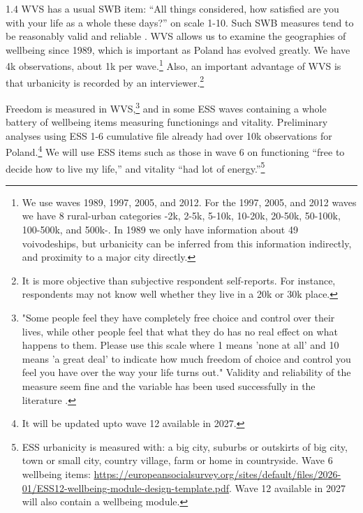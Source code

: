 \documentclass[10pt, letterpaper]{article}
\begin{document}
\begin{spacing}{1.4}
WVS has a usual SWB item:
 ``All things considered, how satisfied are you with your life as a whole these days?''
 on scale 1-10. 
Such SWB measures tend to be reasonably valid and reliable
\citep[][ch. 5]{diener09}. 
% 
WVS allows us to examine the geographies of wellbeing since 1989, which is
important as Poland has evolved greatly.  We have 4k observations, about
  1k per wave.\footnote{We use waves 1989, 1997, 2005, and 2012.
 For the 1997, 2005, and 2012 waves we have 8
rural-urban categories -2k, 2-5k, 5-10k, 10-20k, 20-50k, 50-100k, 100-500k, and
500k-. In 1989 we only have information about 49 voivodeships, but
 urbanicity can be inferred from this information indirectly,
 and proximity to a major city directly.} 
 Also, an important advantage of WVS is
 that urbanicity is recorded by an interviewer.\footnote{It is more objective than subjective respondent self-reports. For
   instance, respondents may not know well whether they live in a 20k or 30k place.}

Freedom is measured in WVS,\footnote{"Some people feel they have completely free choice and control over their lives, while other
      people feel that what they do has no real effect on what happens to them. Please use this scale
      where 1 means 'none at all' and 10 means 'a great deal' to indicate how much freedom of choice
      and control you feel you have over the way your life turns out." 
    Validity and reliability of the measure seem fine and the variable has been used successfully
 in the literature \citep[e.g.,][]{verme09,inglehart08,veenhoven00_b,aok_free_from_to}. }
 and in some ESS waves 
 containing a whole battery of wellbeing items measuring functionings and vitality. 
Preliminary analyses using ESS 1-6 cumulative file already had over 10k
observations for Poland.\footnote{It will be updated upto wave 12 
available in 2027.}
 We will use ESS items such as those in wave 6 on functioning ``free to decide how to live my life,''
 and vitality ``had lot of energy.''\footnote{ESS urbanicity is measured with: a big city, suburbs or outskirts
of big city, town or small city, country village, farm or home in
countryside.
  Wave 6 wellbeing items:
\url{https://europeansocialsurvey.org/sites/default/files/2026-01/ESS12-wellbeing-module-design-template.pdf}.
 Wave 12 available in 2027 will also contain a wellbeing module.
}
 


\end{spacing}
\end{document}
